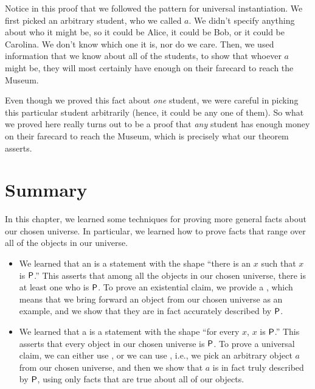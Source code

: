 \documentclass[../../../main.tex]{subfiles}
\begin{document}
Notice in this proof that we followed the pattern for universal instantiation. We first picked an arbitrary student, who we called $a$. We didn't specify anything about who it might be, so it could be Alice, it could be Bob, or it could be Carolina. We don't know which one it is, nor do we care. Then, we used information that we know about all of the students, to show that whoever $a$ might be, they will most certainly have enough on their farecard to reach the Museum.

Even though we proved this fact about \emph{one} student, we were careful in picking this particular student arbitrarily (hence, it could be any one of them). So what we proved here really turns out to be a proof that \emph{any} student has enough money on their farecard to reach the Museum, which is precisely what our theorem asserts.


\section{Summary}

In this chapter, we learned some techniques for proving more general facts about our chosen universe. In particular, we learned how to prove facts that range over all of the objects in our universe.

\begin{itemize}

  \item We learned that an  is a statement with the shape ``there is an $x$ such that $x$ is $\P/$.'' This asserts that among all the objects in our chosen universe, there is at least one who is $\P/$. To prove an existential claim, we provide a , which means that we bring forward an object from our chosen universe as an example, and we show that they are in fact accurately described by $\P/$. 
  
  \item We learned that a  is a statement with the shape ``for every $x$, $x$ is $\P/$.'' This asserts that every object in our chosen universe is $\P/$. To prove a universal claim, we can either use , or we can use , i.e., we pick an arbitrary object $a$ from our chosen universe, and then we show that $a$ is in fact truly described by $\P/$, using only facts that are true about all of our objects.
  
\end{itemize}
\end{document}

